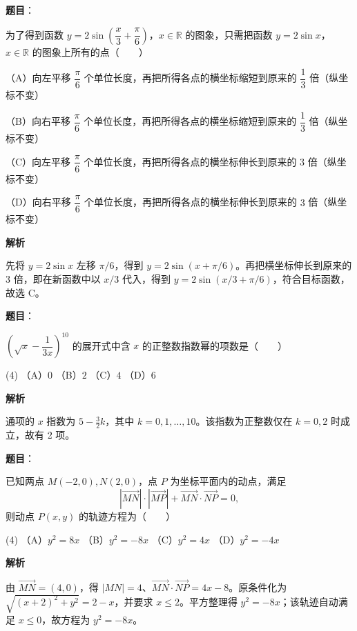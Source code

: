 \begin{answer}

\textbf{题目}：

为了得到函数 $y=2\sin\left(\dfrac{x}{3}+\dfrac{\pi}{6}\right)$，$x\in\mathbb R$ 的图象，只需把函数 $y=2\sin x$，$x\in\mathbb R$ 的图象上所有的点\mbox{（　　）}

（A）向左平移 $\dfrac{\pi}{6}$ 个单位长度，再把所得各点的横坐标缩短到原来的 $\dfrac13$ 倍（纵坐标不变）

（B）向右平移 $\dfrac{\pi}{6}$ 个单位长度，再把所得各点的横坐标缩短到原来的 $\dfrac13$ 倍（纵坐标不变）

（C）向左平移 $\dfrac{\pi}{6}$ 个单位长度，再把所得各点的横坐标伸长到原来的 $3$ 倍（纵坐标不变）

（D）向右平移 $\dfrac{\pi}{6}$ 个单位长度，再把所得各点的横坐标伸长到原来的 $3$ 倍（纵坐标不变）

\textbf{解析}

先将 $y=2\sin x$ 左移 $\pi/6$，得到 $y=2\sin(x+\pi/6)$。再把横坐标伸长到原来的 $3$ 倍，即在新函数中以 $x/3$ 代入，得到 $y=2\sin(x/3+\pi/6)$，符合目标函数，故选 C。


\end{answer}
\begin{answer}

\textbf{题目}：

$\left(\sqrt{x}-\dfrac{1}{3x}\right)^{10}$ 的展开式中含 $x$ 的正整数指数幂的项数是\mbox{（　　）}

\begin{gkopts}(4)
\task （A）$0$
\task （B）$2$
\task （C）$4$
\task （D）$6$
\end{gkopts}

\textbf{解析}

通项的 $x$ 指数为 $5-\frac32k$，其中 $k=0,1,\ldots,10$。该指数为正整数仅在 $k=0,2$ 时成立，故有 2 项。


\end{answer}
\begin{answer}

\textbf{题目}：

已知两点 $M(-2,0),N(2,0)$，点 $P$ 为坐标平面内的动点，满足
\nopagebreak[4]
\[\left|\overrightarrow{MN}\right|\cdot\left|\overrightarrow{MP}\right|+\overrightarrow{MN}\cdot\overrightarrow{NP}=0,\]
则动点 $P(x,y)$ 的轨迹方程为\mbox{（　　）}

\begin{gkopts}(4)
\task （A）$y^2=8x$
\task （B）$y^2=-8x$
\task （C）$y^2=4x$
\task （D）$y^2=-4x$
\end{gkopts}

\textbf{解析}

由 $\overrightarrow{MN}=(4,0)$，得 $|MN|=4$、$\overrightarrow{MN}\cdot\overrightarrow{NP}=4x-8$。原条件化为 $\sqrt{(x+2)^2+y^2}=2-x$，并要求 $x\le2$。平方整理得 $y^2=-8x$；该轨迹自动满足 $x\le0$，故方程为 $y^2=-8x$。


\end{answer}
